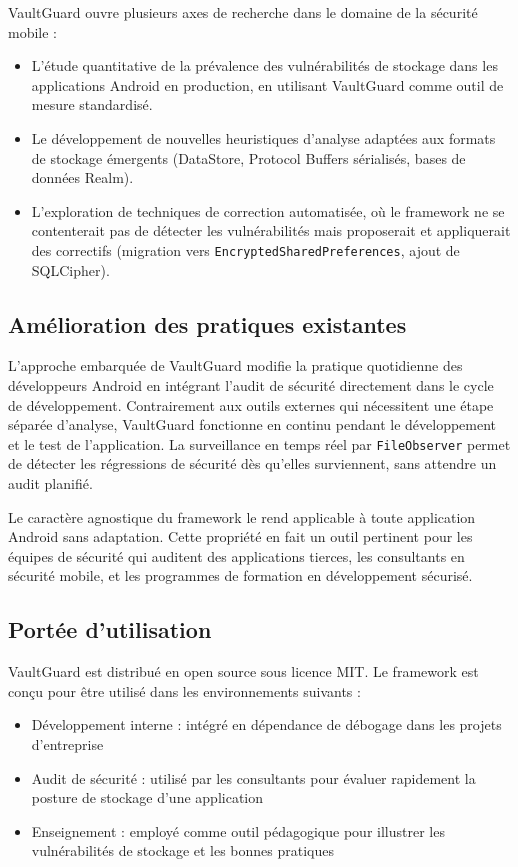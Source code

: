 \documentclass[preprint,12pt, a4paper]{elsarticle}
\begin{document}
VaultGuard ouvre plusieurs axes de recherche dans le domaine de la sécurité mobile :

\begin{itemize}
    \item L'étude quantitative de la prévalence des vulnérabilités de stockage dans les applications Android en production, en utilisant VaultGuard comme outil de mesure standardisé.
    \item Le développement de nouvelles heuristiques d'analyse adaptées aux formats de stockage émergents (DataStore, Protocol Buffers sérialisés, bases de données Realm).
    \item L'exploration de techniques de correction automatisée, où le framework ne se contenterait pas de détecter les vulnérabilités mais proposerait et appliquerait des correctifs (migration vers \texttt{EncryptedSharedPreferences}, ajout de SQLCipher).
\end{itemize}

\subsection{Amélioration des pratiques existantes}

L'approche embarquée de VaultGuard modifie la pratique quotidienne des développeurs Android en intégrant l'audit de sécurité directement dans le cycle de développement. Contrairement aux outils externes qui nécessitent une étape séparée d'analyse, VaultGuard fonctionne en continu pendant le développement et le test de l'application. La surveillance en temps réel par \texttt{FileObserver} permet de détecter les régressions de sécurité dès qu'elles surviennent, sans attendre un audit planifié.

Le caractère agnostique du framework le rend applicable à toute application Android sans adaptation. Cette propriété en fait un outil pertinent pour les équipes de sécurité qui auditent des applications tierces, les consultants en sécurité mobile, et les programmes de formation en développement sécurisé.

\subsection{Portée d'utilisation}

VaultGuard est distribué en open source sous licence MIT. Le framework est conçu pour être utilisé dans les environnements suivants :

\begin{itemize}
    \item Développement interne : intégré en dépendance de débogage dans les projets d'entreprise
    \item Audit de sécurité : utilisé par les consultants pour évaluer rapidement la posture de stockage d'une application
    \item Enseignement : employé comme outil pédagogique pour illustrer les vulnérabilités de stockage et les bonnes pratiques
\end{itemize}
\end{document}
